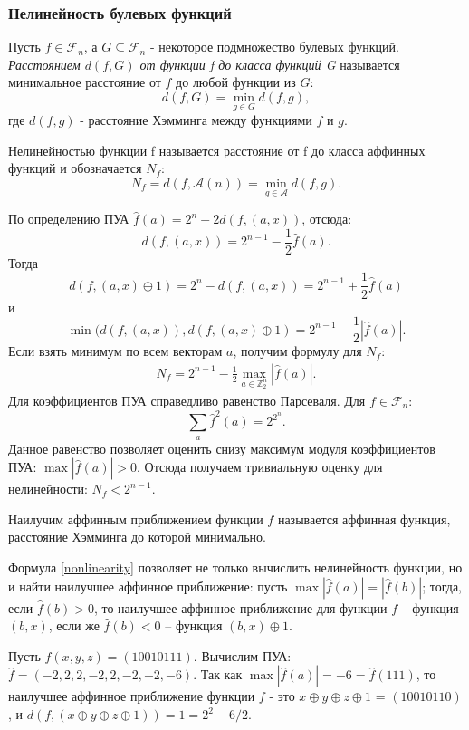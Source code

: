 \subsubsection{Нелинейность булевых функций}
Пусть $f \in \mathcal{F}_n$, а $G \subseteq \mathcal{F}_n$ - некоторое подмножество булевых функций. \textit{Расстоянием $d(f,G)$ от функции f до класса функций G} называется минимальное расстояние от $f$ до любой функции из $G$:
\[
d(f,G) = \min_{g \in G} d(f,g),
\]
где $d(f,g)$ -  расстояние Хэмминга между функциями $f$ и $g$.
\begin{definition}
    Нелинейностью функции \cite{Tokarev} f называется расстояние от f до класса аффинных функций и обозначается $N_f$:
    \[
    N_f  =d(f, \mathcal{A}(n)) = \min_{g \in \mathcal{A}} d(f,g).
    \]
\end{definition}
По определению ПУА $\hat{f}(a) = 2^n - 2d(f, (a,x))$, отсюда:
\[
    d(f, (a,x)) = 2^{n-1} - \frac{1}{2}\hat{f}(a).
\]
Тогда 
\[
    d(f, (a,x) \oplus 1) = 2^n - d(f, (a,x)) = 2^{n-1} + \frac{1}{2}\hat{f}(a)
\]
и 
\[
    \min(d(f, (a,x)), d(f, (a,x) \oplus 1) = 2^{n-1} - \frac{1}{2}|\hat{f}(a)|.
\]
Если взять минимум по всем векторам $a$, получим формулу для $N_f$:
\begin{align}
    N_f = 2^{n-1} - \frac{1}{2}\max_{a \in \mathbb{Z}_2^n}|\hat{f}(a)|.
    \label{nonlinearity}
\end{align}
Для коэффициентов ПУА справедливо равенство Парсеваля. Для $f \in \mathcal{F}_n$:
\[
    \sum_a\hat{f}^2(a)=2^{2^n}.
\]
Данное равенство позволяет оценить снизу максимум модуля коэффициентов ПУА: $\max|\hat{f}(a)| > 0$. Отсюда получаем тривиальную оценку для нелинейности: $N_f < 2^{n-1}$.
\begin{definition}
    Наилучим аффинным приближением функции $f$ называется аффинная функция, расстояние Хэмминга до которой минимально. 
\end{definition}
Формула \eqref{nonlinearity} позволяет не только вычислить нелинейность функции, но и найти наилучшее аффинное приближение: пусть $\max |\hat{f}(a)| = |\hat{f}(b)|$; тогда, если $\hat{f}(b) > 0$, то наилучшее аффинное приближение для функции $f$ – функция $(b,x)$, если же $\hat{f}(b) < 0$ – функция $(b,x) \oplus 1$.
\begin{example}
    Пусть $f(x,y,z) = (10010111)$. Вычислим ПУА: \\
    $\hat{f} = (-2,2,2,-2,2,-2,-2,-6)$. Так как $\max|\hat{f}(a)| = -6 = \hat{f}(111)$, то наилучшее аффинное приближение функции $f$ - это $x \oplus y \oplus z \oplus 1$ = $(10010110)$, и $d(f,(x \oplus y \oplus z \oplus 1)) = 1 = 2^2 - 6/2$.
\end{example}

